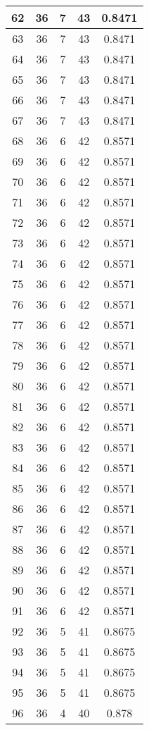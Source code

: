 \documentclass[letterpaper, 12pt]{article}
\begin{document}
\begin{longtable}{|c|c|c|c|c|}
\hline
62 & 36 & 7 & 43 & 0.8471 \\
\hline
63 & 36 & 7 & 43 & 0.8471 \\
\hline
64 & 36 & 7 & 43 & 0.8471 \\
\hline
65 & 36 & 7 & 43 & 0.8471 \\
\hline
66 & 36 & 7 & 43 & 0.8471 \\
\hline
67 & 36 & 7 & 43 & 0.8471 \\
\hline
68 & 36 & 6 & 42 & 0.8571 \\
\hline
69 & 36 & 6 & 42 & 0.8571 \\
\hline
70 & 36 & 6 & 42 & 0.8571 \\
\hline
71 & 36 & 6 & 42 & 0.8571 \\
\hline
72 & 36 & 6 & 42 & 0.8571 \\
\hline
73 & 36 & 6 & 42 & 0.8571 \\
\hline
74 & 36 & 6 & 42 & 0.8571 \\
\hline
75 & 36 & 6 & 42 & 0.8571 \\
\hline
76 & 36 & 6 & 42 & 0.8571 \\
\hline
77 & 36 & 6 & 42 & 0.8571 \\
\hline
78 & 36 & 6 & 42 & 0.8571 \\
\hline
79 & 36 & 6 & 42 & 0.8571 \\
\hline
80 & 36 & 6 & 42 & 0.8571 \\
\hline
81 & 36 & 6 & 42 & 0.8571 \\
\hline
82 & 36 & 6 & 42 & 0.8571 \\
\hline
83 & 36 & 6 & 42 & 0.8571 \\
\hline
84 & 36 & 6 & 42 & 0.8571 \\
\hline
85 & 36 & 6 & 42 & 0.8571 \\
\hline
86 & 36 & 6 & 42 & 0.8571 \\
\hline
87 & 36 & 6 & 42 & 0.8571 \\
\hline
88 & 36 & 6 & 42 & 0.8571 \\
\hline
89 & 36 & 6 & 42 & 0.8571 \\
\hline
90 & 36 & 6 & 42 & 0.8571 \\
\hline
91 & 36 & 6 & 42 & 0.8571 \\
\hline
92 & 36 & 5 & 41 & 0.8675 \\
\hline
93 & 36 & 5 & 41 & 0.8675 \\
\hline
94 & 36 & 5 & 41 & 0.8675 \\
\hline
95 & 36 & 5 & 41 & 0.8675 \\
\hline
96 & 36 & 4 & 40 & 0.878 \\

\end{longtable}
\end{document}
